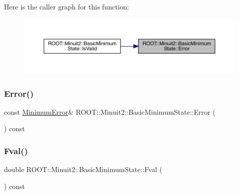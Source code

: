 Here is the caller graph for this function\+:\nopagebreak
\begin{figure}[H]
\begin{center}
\leavevmode
\includegraphics[width=350pt]{d0/db1/classROOT_1_1Minuit2_1_1BasicMinimumState_a67a7536f33473e23c3461e0c7029e5c5_icgraph}
\end{center}
\end{figure}
\mbox{\label{classROOT_1_1Minuit2_1_1BasicMinimumState_a67a7536f33473e23c3461e0c7029e5c5}} 
\subsubsection{\texorpdfstring{Error()}{Error()}\hspace{0.1cm}{\footnotesize\ttfamily [2/2]}}
{\footnotesize\ttfamily const \mbox{\hyperlink{classROOT_1_1Minuit2_1_1MinimumError}{Minimum\+Error}}\& R\+O\+O\+T\+::\+Minuit2\+::\+Basic\+Minimum\+State\+::\+Error (\begin{DoxyParamCaption}{ }\end{DoxyParamCaption}) const\hspace{0.3cm}{\ttfamily [inline]}}

\mbox{\label{classROOT_1_1Minuit2_1_1BasicMinimumState_a5151d99e7c6cd7f3b070ad2c62222010}} 
\subsubsection{\texorpdfstring{Fval()}{Fval()}\hspace{0.1cm}{\footnotesize\ttfamily [1/2]}}
{\footnotesize\ttfamily double R\+O\+O\+T\+::\+Minuit2\+::\+Basic\+Minimum\+State\+::\+Fval (\begin{DoxyParamCaption}{ }\end{DoxyParamCaption}) const\hspace{0.3cm}{\ttfamily [inline]}}

